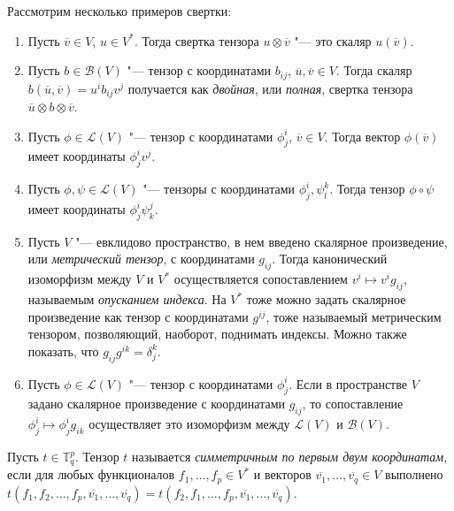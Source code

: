 \begin{example}
    Рассмотрим несколько примеров свертки:
    \begin{enumerate}
        \item Пусть $\overline{v} \in V$, $u \in V^*$. Тогда свертка тензора $u \otimes \overline{v}$ "--- это скаляр $u(\overline{v})$.
        \item Пусть $b \in \mathcal{B}(V)$ "--- тензор с координатами $b_{ij}$, $\overline{u}, \overline{v} \in V$. Тогда скаляр $b(\overline{u}, \overline{v}) = u^ib_{ij}v^j$ получается как \textit{двойная}, или \textit{полная}, свертка тензора $\overline{u} \otimes b \otimes \overline{v}$.
        \item Пусть $\phi \in \mathcal{L}(V)$ "--- тензор с координатами $\phi^i_j$, $\overline{v} \in V$. Тогда вектор $\phi(\overline{v})$ имеет координаты $\phi^i_jv^j$.
        \item Пусть $\phi, \psi \in \mathcal{L}(V)$ "--- тензоры с координатами $\phi^i_j, \psi^k_l$. Тогда тензор $\phi \circ \psi$ имеет координаты $\phi^i_j\psi^j_k$.
        \item Пусть $V$ "--- евклидово пространство, в нем введено скалярное произведение, или \textit{метрический тензор}, с координатами $g_{ij}$. Тогда канонический изоморфизм между $V$ и $V^*$ осуществляется сопоставлением $v^i \mapsto v^ig_{ij}$, называемым \textit{опусканием индекса}. На $V^*$ тоже можно задать скалярное произведение как тензор с координатами $g^{ij}$, тоже называемый метрическим тензором, позволяющий, наоборот, поднимать индексы. Можно также показать, что $g_{ij}g^{ik} = \delta^k_j$.
        \item Пусть $\phi \in \mathcal{L}(V)$ "--- тензор с координатами $\phi^i_j$. Если в пространстве $V$ задано скалярное произведение с координатами $g_{ij}$, то сопоставление $\phi^i_j \mapsto \phi^i_jg_{ik}$ осуществляет это изоморфизм между $\mathcal{L}(V)$ и $\mathcal{B}(V)$.
    \end{enumerate}
\end{example}

\begin{definition}
    Пусть $t \in \mathbb{T}^p_q$. Тензор $t$ называется \textit{симметричным по первым двум координатам}, если для любых функционалов $f_1, \dots, f_p \in V^*$ и векторов $\overline{v_1}, \dots, \overline{v_q} \in V$ выполнено $t(f_1, f_2, \dots, f_p, \overline{v_1}, \dots, \overline{v_q}) = t(f_2, f_1, \dots, f_p, \overline{v_1}, \dots, \overline{v_q})$.
\end{definition}

